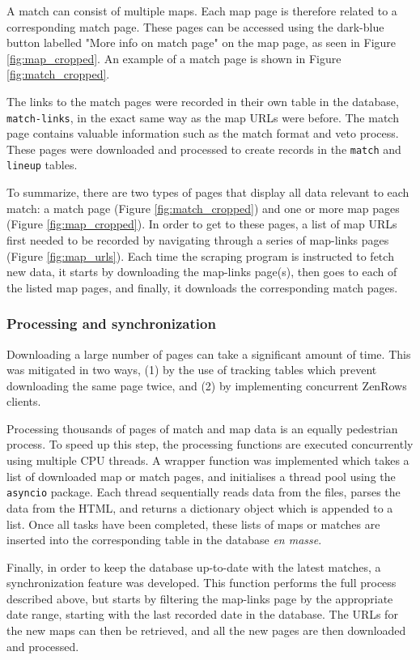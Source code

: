 A match can consist of multiple maps. Each map page is therefore related to a corresponding match page. These pages can be accessed using the dark-blue button labelled "More info on match page" on the map page, as seen in Figure \ref{fig:map_cropped}. An example of a match page is shown in Figure \ref{fig:match_cropped}. 

The links to the match pages were recorded in their own table in the database, \texttt{match-links}, in the exact same way as the map URLs were before. The match page contains valuable information such as the match format and veto process. These pages were downloaded and processed to create records in the \texttt{match} and \texttt{lineup} tables.

To summarize, there are two types of pages that display all data relevant to each match: a match page (Figure \ref{fig:match_cropped}) and one or more map pages (Figure \ref{fig:map_cropped}). In order to get to these pages, a list of map URLs first needed to be recorded by navigating through a series of map-links pages (Figure \ref{fig:map_urls}). Each time the scraping program is instructed to fetch new data, it starts by downloading the map-links page(s), then goes to each of the listed map pages, and finally, it downloads the corresponding match pages.

\subsubsection{Processing and synchronization}

Downloading a large number of pages can take a significant amount of time. This was mitigated in two ways, (1) by the use of tracking tables which prevent downloading the same page twice, and (2) by implementing concurrent ZenRows clients. 

Processing thousands of pages of match and map data is an equally pedestrian process. To speed up this step, the processing functions are executed concurrently using multiple CPU threads. A wrapper function was implemented which takes a list of downloaded map or match pages, and initialises a thread pool using the \texttt{asyncio} package. Each thread sequentially reads data from the files, parses the data from the HTML, and returns a dictionary object which is appended to a list. Once all tasks have been completed, these lists of maps or matches are inserted into the corresponding table in the database \textit{en masse}.

Finally, in order to keep the database up-to-date with the latest matches, a synchronization feature was developed. This function performs the full process described above, but starts by filtering the map-links page by the appropriate date range, starting with the last recorded date in the database. The URLs for the new maps can then be retrieved, and all the new pages are then downloaded and processed.

